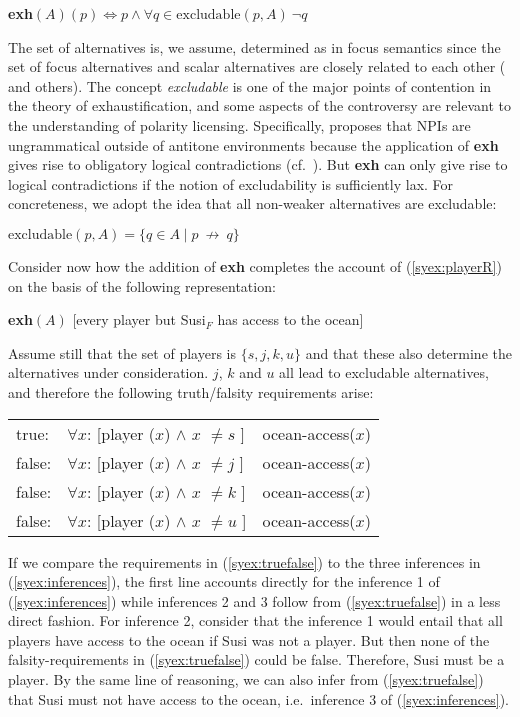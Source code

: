 \documentclass[output=paper]{langscibook}
\begin{document}
\ea \label{syex:exh}
\textbf{exh}$(A)(p) \Leftrightarrow p \land \forall q \in \text{excludable}(p,A) \ \neg q$\z

The set of alternatives is, we assume, determined as in focus semantics since the set of focus alternatives and scalar alternatives are closely related to each other (\citealt{gotzner19a} and others).
The concept \emph{excludable} is one of the major points of contention in the theory of exhaustification, and some aspects of the controversy are relevant to the understanding of polarity licensing.
Specifically, \citet{chierchia13a} proposes that NPIs are ungrammatical outside of antitone environments because the application of \textbf{exh} gives rise to obligatory logical contradictions (cf.\ \citealt{crnic14a}).
But \textbf{exh} can only give rise to logical contradictions if the notion of excludability is sufficiently lax.
For concreteness, we adopt the idea that all non-weaker alternatives are excludable:

\ea \label{syexcludable}
$\text{excludable}(p,A) = \{q \in A \mid p\  \not\rightarrow\ q\}$\z


Consider now how the addition of \textbf{exh} completes the account of (\ref{syex:playerR}) on the basis of the following representation:

\ea \label{syex:playerLF}
     \textbf{exh}$(A)$ [every player but Susi$_F$ has access to the ocean]\z

Assume still that the set of players is $\{s, j, k, u\}$ and that these also determine the alternatives under consideration.
$j$, $k$ and $u$ all lead to excludable alternatives, and therefore the following truth/falsity requirements arise:

\ea \label{syex:truefalse}
    \begin{tabular}[t]{@{}l@{~}l@{~$\rightarrow$~}l@{}}
    true:  & $\forall x$: [player ($x$) $\land$ $x$ $\neq s$ ] & ocean-access($x$)\\
    false: & $\forall x$: [player ($x$) $\land$ $x$ $\neq j$ ] & ocean-access($x$)\\
    false: & $\forall x$: [player ($x$) $\land$ $x$ $\neq k$ ] & ocean-access($x$)\\
    false: & $\forall x$: [player ($x$) $\land$ $x$ $\neq u$ ] & ocean-access($x$)\\
    \end{tabular}
\z

If we compare the requirements in (\ref{syex:truefalse}) to the three inferences in (\ref{syex:inferences}), the first line accounts directly for the inference 1 of (\ref{syex:inferences}) while inferences 2 and 3  follow from (\ref{syex:truefalse}) in a less direct fashion.
For inference 2, consider that the inference 1 would entail that all players have access to the ocean if Susi was not a player.
But then none of the falsity-requirements in (\ref{syex:truefalse}) could be false. Therefore, Susi must be a player.
By the same line of reasoning, we can also infer from (\ref{syex:truefalse}) that Susi must not have access to the ocean, i.e.\ inference 3 of (\ref{syex:inferences}).
\end{document}
